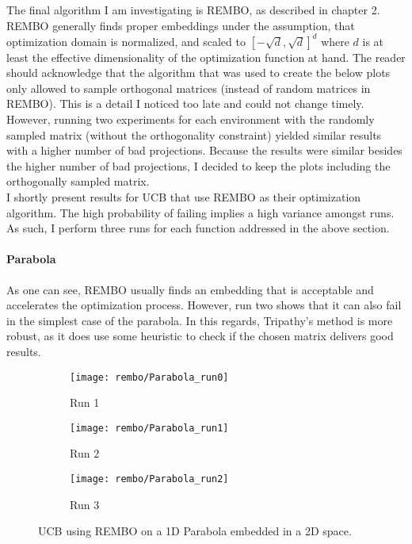 The final algorithm I am investigating is REMBO, as described in chapter 2.
REMBO generally finds proper embeddings under the assumption, that optimization domain is normalized, and scaled to $[-\sqrt{d}, \sqrt{d}]^d$ where $d$ is at least the effective dimensionality of the optimization function at hand. 
The reader should acknowledge that the algorithm that was used to create the below plots only allowed to sample orthogonal matrices (instead of random matrices in REMBO).
This is a detail I noticed too late and could not change timely.
However, running two experiments for each environment with the randomly sampled matrix (without the orthogonality constraint) yielded similar results with a higher number of bad projections.
Because the results were similar besides the higher number of bad projections, I decided to keep the plots including the orthogonally sampled matrix. \\

I shortly present results for UCB that use REMBO as their optimization algorithm.
The high probability of failing implies a high variance amongst runs. 
As such, I perform three runs for each function addressed in the above section.

\paragraph{Parabola}
As one can see, REMBO usually finds an embedding that is acceptable and accelerates the optimization process.
However, run two shows that it can also fail in the simplest case of the parabola.
In this regards, Tripathy's method is more robust, as it does use some heuristic to check if the chosen matrix delivers good results.


\begin{figure}[H]
\center
    \begin{subfigure}[b]{0.30\textwidth}
        \texttt{[image: rembo/Parabola\_run0]}
        \label{fig:gull}
         \caption{Run 1}
    \end{subfigure}
        \begin{subfigure}[b]{0.30\textwidth}
        \texttt{[image: rembo/Parabola\_run1]}
        \label{fig:gull}
        \caption{Run 2}
    \end{subfigure}
    \begin{subfigure}[b]{0.30\textwidth}
        \texttt{[image: rembo/Parabola\_run2]}
        \label{fig:gull}
               \caption{Run 3}
    \end{subfigure}
        \caption{UCB using REMBO on a 1D Parabola embedded in a 2D space.
    }\label{fig:animals}
\end{figure}


